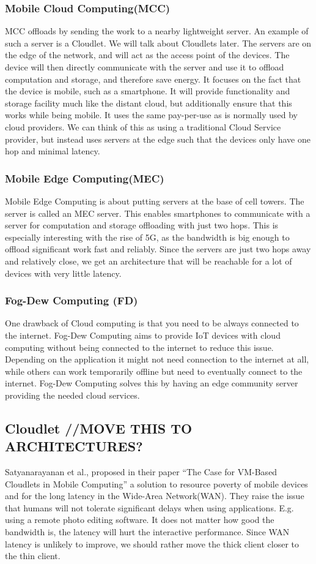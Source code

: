 \subsubsection{Mobile Cloud Computing(MCC)}
MCC offloads by sending the work to a nearby lightweight server. An example of such a server is a Cloudlet. We will talk about Cloudlets later. The servers are on the edge of the network, and will act as the access point of the devices. The device will then directly communicate with the server and use it to offload computation and storage, and therefore save energy. It focuses on the fact that the device is mobile, such as a smartphone. It will provide functionality and storage facility much like the distant cloud, but additionally ensure that this works while being mobile. It uses the same pay-per-use as is normally used by cloud providers. We can think of this as using a traditional Cloud Service provider, but instead uses servers at the edge such that the devices only have one hop and minimal latency.

\subsubsection{Mobile Edge Computing(MEC)}
Mobile Edge Computing is about putting servers at the base of cell towers. The server is called an MEC server. This enables smartphones to communicate with a server for computation and storage offloading with just two hops. This is especially interesting with the rise of 5G, as the bandwidth is big enough to offload significant work fast and reliably. Since the servers are just two hops away and relatively close, we get an architecture that will be reachable for a lot of devices with very little latency.

\subsubsection{Fog-Dew Computing (FD)}
One drawback of Cloud computing is that you need to be always connected to the internet. 
Fog-Dew Computing aims to provide IoT devices with cloud computing without being connected to the internet to reduce this issue. Depending on the application it might not need connection to the internet at all, while others can work temporarily offline but need to eventually connect to the internet. Fog-Dew Computing solves this by having an edge community server providing the needed cloud services. 

\subsection{Cloudlet //MOVE THIS TO ARCHITECTURES?}
Satyanarayanan et al., proposed in their paper “The Case for VM-Based Cloudlets in Mobile Computing”\cite{satyanarayanan_case_2009} a solution to resource poverty of mobile devices and for the long latency in the Wide-Area Network(WAN). They raise the issue that humans will not tolerate significant delays when using applications. E.g. using a remote photo editing software. It does not matter how good the bandwidth is, the latency will hurt the interactive performance. Since WAN latency is unlikely to improve, we should rather move the thick client closer to the thin client. 


